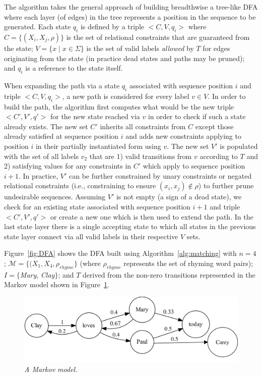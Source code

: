 \documentclass[phd,electronic,oneside,twosidetoc,letterpaper,chaptercenter,parttop,lof,lot]{byumsphd}
\begin{document}
The algorithm takes the general approach of building breadthwise a tree-like DFA where each layer (of edges) in the tree represents a position in the sequence to be generated. Each state $q_i$ is defined by a triple $<C,V,q_i>$ where $C = \{(X_i,X_j,\rho)\}$ is the set of relational constraints that are guaranteed from the state; $V=\{x\mid x\in\Sigma\}$ is the set of valid labels \emph{allowed} by $T$ for edges originating from the state (in practice dead states and paths may be pruned); and $q_i$ is a reference to the state itself.

When expanding the path via a state $q_i$ associated with sequence position $i$ and triple $<C,V,q_i>$, a new path is considered for every label $v\in V$. In order to build the path, the algorithm first computes what would be the new triple $<C',V',q'>$ for the new state reached via $v$ in order to check if such a state already exists. The new set $C'$ inherits all constraints from $C$ except those already satisfied at sequence position $i$ and adds new constraints applying to position $i$ in their partially instantiated form using $v$. The new set $V'$ is populated with the set of all labels $v_2$ that are 1) valid transitions from $v$ according to $T$ and 2) satisfying values for any constraints in $C'$ which apply to sequence position $i+1$. In practice, $V'$ can be further constrained by unary constraints or negated relational constraints (i.e., constraining to ensure $(x_i,x_j)\not\in\rho$) to further prune undesirable sequences. Assuming $V'$ is not empty (a sign of a dead state), we check for an existing state associated with sequence position $i+1$ and triple $<C',V',q'>$ or create a new one which is then used to extend the path. In the last state layer there is a single accepting state to which all states in the previous state layer connect via all valid labels in their respective $V$ sets. 

Figure~\ref{fig:DFA} shows the DFA built using Algorithm~\ref{alg:matching} with $n=4$; $\mathcal{M}=\{(X_1,X_4,\rho_{rhyme}\}$ (where $\rho_{rhyme}$ represents the set of rhyming word pairs); $I=\{$\textit{Mary}, \textit{Clay}$\}$; and $T$ derived from the non-zero transitions represented in the Markov model shown in Figure~\ref{fig:markov}.

\begin{figure}
\centering
\includegraphics[width=\linewidth]{markov}
\caption{\textit{A Markov model.}}
\label{fig:markov}
\end{figure}
\end{document}
